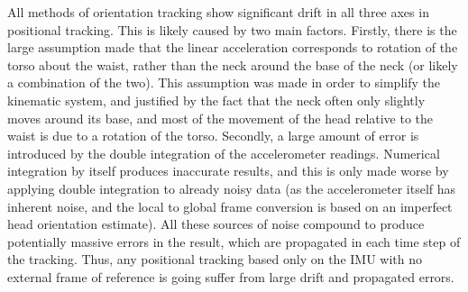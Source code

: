 \documentclass[11pt,a4paper]{article}
\begin{document}
	All methods of orientation tracking show significant drift in all three axes in positional tracking. This is likely caused by two main factors. Firstly, there is the large assumption made that the linear acceleration corresponds to rotation of the torso about the waist, rather than the neck around the base of the neck (or likely a combination of the two). This assumption was made in order to simplify the kinematic system, and justified by the fact that the neck often only slightly moves around its base, and most of the movement of the head relative to the waist is due to a rotation of the torso. Secondly, a large amount of error is introduced by the double integration of the accelerometer readings. Numerical integration by itself produces inaccurate results, and this is only made worse by applying double integration to already noisy data (as the accelerometer itself has inherent noise, and the local to global frame conversion is based on an imperfect head orientation estimate). All these sources of noise compound to produce potentially massive errors in the result, which are propagated in each time step of the tracking. Thus, any positional tracking based only on the IMU with no external frame of reference is going suffer from large drift and propagated errors.
\end{document}
